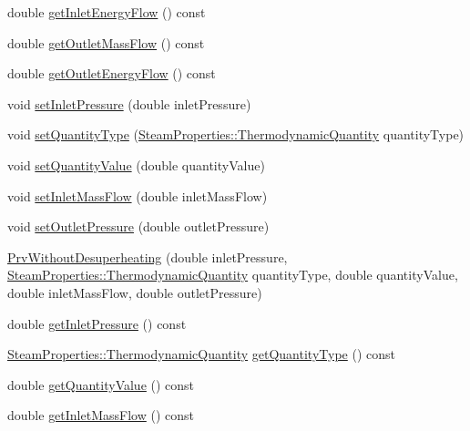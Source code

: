 \begin{DoxyCompactItemize}
\item 
double \hyperlink{class_prv_without_desuperheating_a040dbe6a11a722f15450cd00ac454c48}{get\+Inlet\+Energy\+Flow} () const
\item 
double \hyperlink{class_prv_without_desuperheating_a12c0bf1f0c29e56e6e07ece3fe865c1b}{get\+Outlet\+Mass\+Flow} () const
\item 
double \hyperlink{class_prv_without_desuperheating_ab13245e86b90832de0b4190163236551}{get\+Outlet\+Energy\+Flow} () const
\item 
void \hyperlink{class_prv_without_desuperheating_a26039a0a228ca66f96e8402bf741b9d9}{set\+Inlet\+Pressure} (double inlet\+Pressure)
\item 
void \hyperlink{class_prv_without_desuperheating_a212177b7a16c7452358df4120196c04b}{set\+Quantity\+Type} (\hyperlink{class_steam_properties_ae0294bedf7d178c2d8fb6aed0f62fbff}{Steam\+Properties\+::\+Thermodynamic\+Quantity} quantity\+Type)
\item 
void \hyperlink{class_prv_without_desuperheating_a5ed2d0f0f558705d482ed0502131757f}{set\+Quantity\+Value} (double quantity\+Value)
\item 
void \hyperlink{class_prv_without_desuperheating_abeccff2dc91144452b34ca343ee63fa7}{set\+Inlet\+Mass\+Flow} (double inlet\+Mass\+Flow)
\item 
void \hyperlink{class_prv_without_desuperheating_a0f2a4597b58390e5c4a7c75b38bbebbc}{set\+Outlet\+Pressure} (double outlet\+Pressure)
\item 
\hyperlink{class_prv_without_desuperheating_a27a40131cc8567ec51bb8d6d522268c0}{Prv\+Without\+Desuperheating} (double inlet\+Pressure, \hyperlink{class_steam_properties_ae0294bedf7d178c2d8fb6aed0f62fbff}{Steam\+Properties\+::\+Thermodynamic\+Quantity} quantity\+Type, double quantity\+Value, double inlet\+Mass\+Flow, double outlet\+Pressure)
\item 
double \hyperlink{class_prv_without_desuperheating_a4b1244b479abfaef01abbb62395dff13}{get\+Inlet\+Pressure} () const
\item 
\hyperlink{class_steam_properties_ae0294bedf7d178c2d8fb6aed0f62fbff}{Steam\+Properties\+::\+Thermodynamic\+Quantity} \hyperlink{class_prv_without_desuperheating_ad465c855f0c7271110ed2cb2ebccf081}{get\+Quantity\+Type} () const
\item 
double \hyperlink{class_prv_without_desuperheating_a1113c254f45d08588b0afe4bd1273530}{get\+Quantity\+Value} () const
\item 
double \hyperlink{class_prv_without_desuperheating_a0ae2ed88cc8bd4e69cddc05ef1225811}{get\+Inlet\+Mass\+Flow} () const

\end{DoxyCompactItemize}
